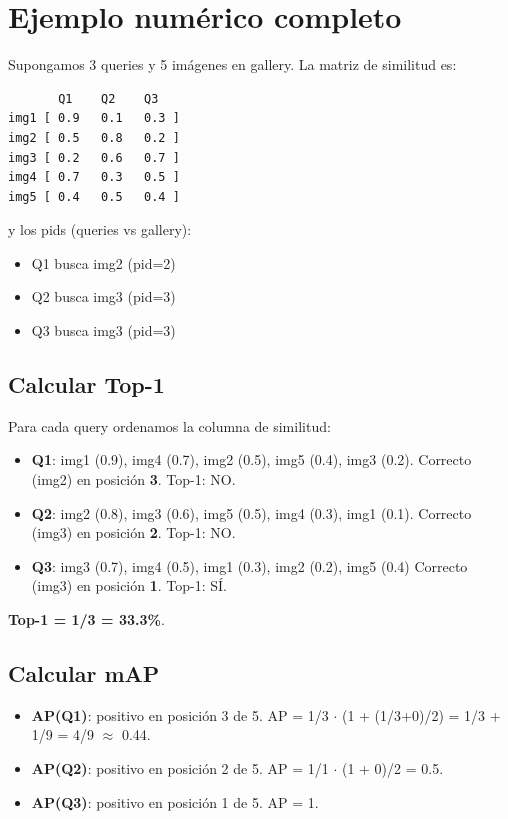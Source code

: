 \section{Ejemplo numérico completo}

Supongamos 3 queries y 5 imágenes en gallery. La matriz de
similitud es:

\begin{verbatim}
       Q1    Q2    Q3
img1 [ 0.9   0.1   0.3 ]
img2 [ 0.5   0.8   0.2 ]
img3 [ 0.2   0.6   0.7 ]
img4 [ 0.7   0.3   0.5 ]
img5 [ 0.4   0.5   0.4 ]
\end{verbatim}

\noindent y los pids (queries vs gallery):
\begin{itemize}
  \item Q1 busca img2 (pid=2)
  \item Q2 busca img3 (pid=3)
  \item Q3 busca img3 (pid=3)
\end{itemize}

\subsection*{Calcular Top-1}

Para cada query ordenamos la columna de similitud:

\begin{itemize}
  \item \textbf{Q1}: img1 (0.9), img4 (0.7), img2 (0.5), img5 (0.4), img3 (0.2).
        Correcto (img2) en posición \textbf{3}. Top-1: NO.
  \item \textbf{Q2}: img2 (0.8), img3 (0.6), img5 (0.5), img4 (0.3), img1 (0.1).
        Correcto (img3) en posición \textbf{2}. Top-1: NO.
  \item \textbf{Q3}: img3 (0.7), img4 (0.5), img1 (0.3), img2 (0.2), img5 (0.4)
        Correcto (img3) en posición \textbf{1}. Top-1: SÍ.
\end{itemize}

\noindent\textbf{Top-1 = 1/3 = 33.3\%}.

\subsection*{Calcular mAP}

\begin{itemize}
  \item \textbf{AP(Q1)}: positivo en posición 3 de 5.
        AP = 1/3 $\cdot$ (1 + (1/3+0)/2) = 1/3 + 1/9 = 4/9 $\approx$ 0.44.
  \item \textbf{AP(Q2)}: positivo en posición 2 de 5.
        AP = 1/1 $\cdot$ (1 + 0)/2 = 0.5.
  \item \textbf{AP(Q3)}: positivo en posición 1 de 5.
        AP = 1.
\end{itemize}

